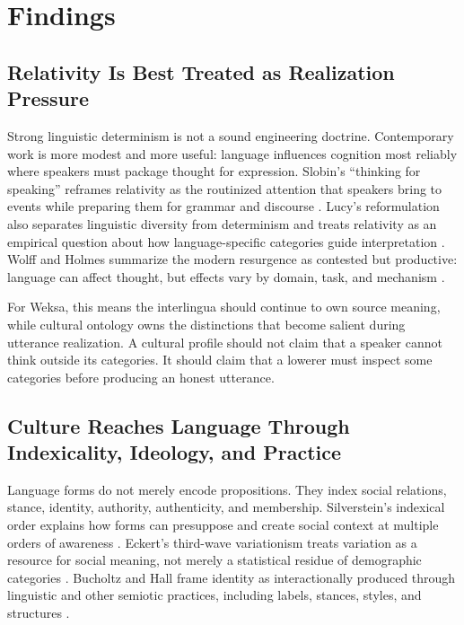 \documentclass[11pt]{article}
\begin{document}
\section{Findings}

\subsection{Relativity Is Best Treated as Realization Pressure}

Strong linguistic determinism is not a sound engineering doctrine. Contemporary
work is more modest and more useful: language influences cognition most
reliably where speakers must package thought for expression. Slobin's
``thinking for speaking'' reframes relativity as the routinized attention that
speakers bring to events while preparing them for grammar and discourse
\cite{slobin1996}. Lucy's reformulation also separates linguistic diversity
from determinism and treats relativity as an empirical question about how
language-specific categories guide interpretation \cite{lucy1992,lucy1997}.
Wolff and Holmes summarize the modern resurgence as contested but productive:
language can affect thought, but effects vary by domain, task, and mechanism
\cite{wolffholmes2011}.

For Weksa, this means the interlingua should continue to own source meaning,
while cultural ontology owns the distinctions that become salient during
utterance realization. A cultural profile should not claim that a speaker
cannot think outside its categories. It should claim that a lowerer must inspect
some categories before producing an honest utterance.

\subsection{Culture Reaches Language Through Indexicality, Ideology, and Practice}

Language forms do not merely encode propositions. They index social relations,
stance, identity, authority, authenticity, and membership. Silverstein's
indexical order explains how forms can presuppose and create social context at
multiple orders of awareness \cite{silverstein2003}. Eckert's third-wave
variationism treats variation as a resource for social meaning, not merely a
statistical residue of demographic categories \cite{eckert2012}. Bucholtz and
Hall frame identity as interactionally produced through linguistic and other
semiotic practices, including labels, stances, styles, and structures
\cite{bucholtzhall2005}.
\end{document}
